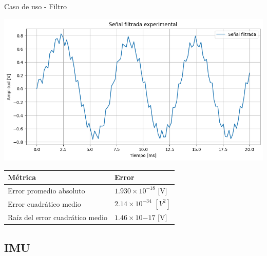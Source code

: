 \documentclass[10pt,aspectratio=169]{beamer} %
\begin{document}
\begin{frame}{Caso de uso - Filtro}
\begin{minipage}{0.45\linewidth}
  \end{minipage}%
  \hfill
  \begin{minipage}{0.55\linewidth}
    \centering
    \includegraphics[scale=0.15]{Filtro/filt_exp.png}
  \end{minipage}

  \vspace{0.5cm} %

    \begin{minipage}{0.9\linewidth} %
      \centering
      \begin{tabular}{ll}
        Métrica                       & Error \\ \hline
        Error promedio absoluto         &   $1.930 \times 10^{-18}$ [V]    \\
        Error cuadrático medio          &   $2.14 \times 10^{-34}$ $[V^{2}]$    \\
        Raíz del error cuadrático medio &   $1.46 \times 10{-17}$ [V]  
        \end{tabular}
    \end{minipage}
  
\end{frame}

\subsection{IMU}
\end{document}
